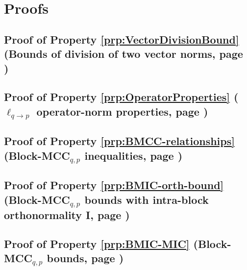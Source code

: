 \chapter{Proofs}
\label{chap:Appendices-Proofs}
\section{Proof of Property \ref{prp:VectorDivisionBound} (Bounds of division of two vector norms, page \pageref{prp:VectorDivisionBound})}
\label{prf:VectorDivisionBound}

\newpage
\section{Proof of Property \ref{prp:OperatorProperties} ($\ell_{q {\to} p}$ operator-norm properties, page \pageref{prp:OperatorProperties})}
\label{prf:OperatorProperties}

\newpage
\section{Proof of Property \ref{prp:BMCC-relationships} (Block-MCC$_{q,p}$ inequalities, page \pageref{prp:BMCC-relationships})}
\label{prf:BMCC-relationships}

\newpage
\section{Proof of Property \ref{prp:BMIC-orth-bound} (Block-MCC$_{q,p}$ bounds with intra-block orthonormality I, page \pageref{prp:BMIC-orth-bound})}
\label{prf:BMIC-bounds}

\newpage
\section{Proof of Property \ref{prp:BMIC-MIC} (Block-MCC$_{q,p}$ bounds, page \pageref{prp:BMIC-MIC})}
\label{prf:BMIC-MIC} 

\newpage
